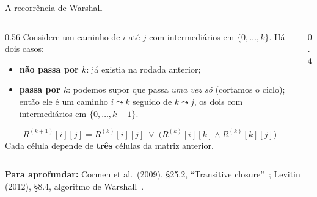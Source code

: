 \documentclass[aspectratio=169,xcolor=table]{beamer}
\newcommand{\fonte}[1]{%
  \vfill
  {\tiny\color{gray!55!black}\textbf{Para aprofundar:} #1\par}%
}
\begin{document}
\begin{frame}{A recorrência de Warshall}
  \begin{columns}[c]
    \begin{column}{0.56\textwidth}
      \scriptsize Considere um caminho de $i$ até $j$ com intermediários em $\{0,\dots,k\}$.
      Há dois casos:
      \begin{itemize}\scriptsize
        \item \textbf{não passa por $k$}: já existia na rodada anterior;
        \item \textbf{passa por $k$}: podemos supor que passa \emph{uma vez só} (cortamos
              o ciclo); então ele é um caminho $i \leadsto k$ seguido de $k \leadsto j$, os
              dois com intermediários em $\{0,\dots,k-1\}$.
      \end{itemize}
      \[
        R^{(k+1)}[i][j] = R^{(k)}[i][j] \;\lor\; \bigl(R^{(k)}[i][k] \land R^{(k)}[k][j]\bigr)
      \]
      Cada célula depende de \textbf{três} células da matriz anterior.
    \end{column}
    \begin{column}{0.4\textwidth}
      \centering
    \end{column}
  \end{columns}
  \fonte{Cormen et al.\ (2009), \S 25.2, ``Transitive closure''~\cite{cormen2009introduction};
    Levitin (2012), \S 8.4, algoritmo de Warshall~\cite{levitin2012introduction}.}
\end{frame}
\end{document}
